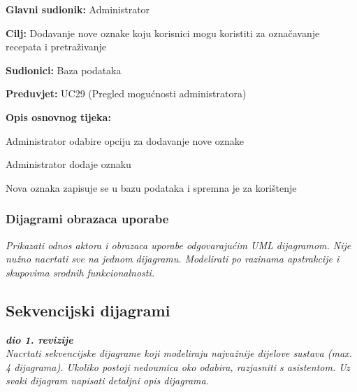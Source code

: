					\noindent {}
					\begin{packed_item}
						
						\item \textbf{Glavni sudionik: }Administrator
						\item \textbf{Cilj: }Dodavanje nove oznake koju korisnici mogu koristiti za označavanje recepata i pretraživanje
						\item \textbf{Sudionici: }Baza podataka
						\item \textbf{Preduvjet: }UC29 (Pregled mogućnosti administratora)
						\item \textbf{Opis osnovnog tijeka:}
						
						\item[] \begin{packed_enum}
							\item Administrator odabire opciju za dodavanje nove oznake
							\item Administrator dodaje oznaku
							\item Nova oznaka zapisuje se u bazu podataka i spremna je za korištenje
						\end{packed_enum}
					\end{packed_item}
					
				
					
				\subsubsection{Dijagrami obrazaca uporabe}
					
					\textit{Prikazati odnos aktora i obrazaca uporabe odgovarajućim UML dijagramom. Nije nužno nacrtati sve na jednom dijagramu. Modelirati po razinama apstrakcije i skupovima srodnih funkcionalnosti.}
				\eject		
				
			\subsection{Sekvencijski dijagrami}
				
				\textbf{\textit{dio 1. revizije}}\\
				
				\textit{Nacrtati sekvencijske dijagrame koji modeliraju najvažnije dijelove sustava (max. 4 dijagrama). Ukoliko postoji nedoumica oko odabira, razjasniti s asistentom. Uz svaki dijagram napisati detaljni opis dijagrama.}
				\eject
	
